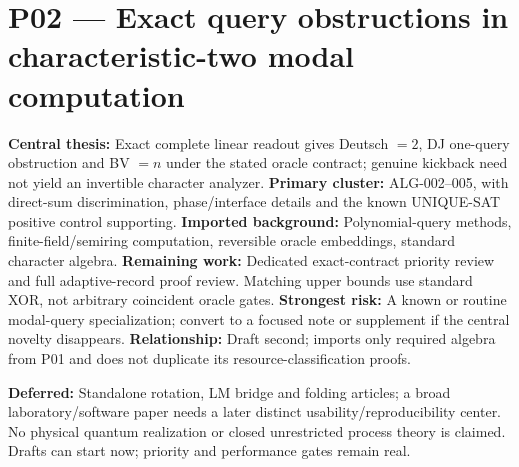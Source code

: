 \documentclass[10pt]{article}
\begin{document}
\section*{P02 --- Exact query obstructions in characteristic-two modal computation}
\textbf{Central thesis:} Exact complete linear readout gives Deutsch $=2$, DJ
one-query obstruction and BV $=n$ under the stated oracle contract; genuine
kickback need not yield an invertible character analyzer.
\textbf{Primary cluster:} ALG-002--005, with direct-sum discrimination,
phase/interface details and the known UNIQUE-SAT positive control supporting.
\textbf{Imported background:} Polynomial-query methods, finite-field/semiring
computation, reversible oracle embeddings, standard character algebra.
\textbf{Remaining work:} Dedicated exact-contract priority review and full
adaptive-record proof review. Matching upper bounds use standard XOR, not
arbitrary coincident oracle gates.
\textbf{Strongest risk:} A known or routine modal-query specialization; convert
to a focused note or supplement if the central novelty disappears.
\textbf{Relationship:} Draft second; imports only required algebra from P01 and
does not duplicate its resource-classification proofs.

\vfill
\textbf{Deferred:} Standalone rotation, LM bridge and folding articles; a broad
laboratory/software paper needs a later distinct usability/reproducibility
center. No physical quantum realization or closed unrestricted process theory
is claimed. Drafts can start now; priority and performance gates remain real.
\end{document}
